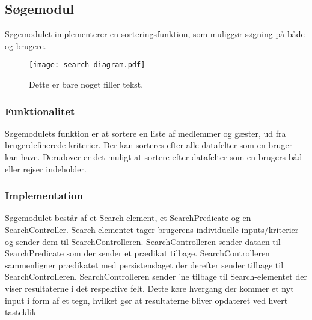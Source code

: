 \subsection{Søgemodul}
\label{sub:s_searchmodul}

Søgemodulet implementerer en sorteringsfunktion, som muliggør søgning på både og brugere.

\begin{figure}
  \centering
  \texttt{[image: search-diagram.pdf]}
  \caption{Dette er bare noget filler tekst.}
\end{figure}
\subsubsection{Funktionalitet}
\label{sub:funktionalitet}

Søgemodulets funktion er at sortere en liste af medlemmer og gæster, ud fra brugerdefinerede kriterier. Der kan sorteres efter alle datafelter som en bruger kan have. Derudover er det muligt at sortere efter datafelter som en brugers båd eller rejser indeholder. 

\subsubsection{Implementation}
\label{sub:implementation}

Søgemodulet består af et Search-element, et SearchPredicate og en SearchController. Search-elementet tager brugerens individuelle inputs/kriterier og sender dem til SearchControlleren. SearchControlleren sender dataen til SearchPredicate som der sender et prædikat tilbage. SearchControlleren sammenligner prædikatet med persistenslaget der derefter sender  tilbage til SearchControlleren. SearchControlleren sender 'ne tilbage til Search-elementet der viser resultaterne i det respektive felt. Dette køre hvergang der kommer et nyt input i form af et tegn, hvilket gør at resultaterne bliver opdateret ved hvert tasteklik




